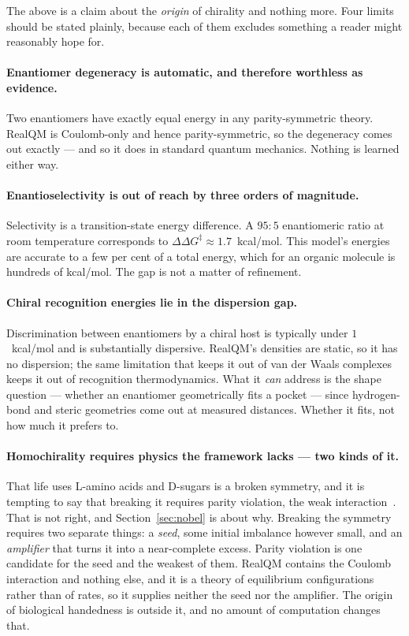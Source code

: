 \documentclass[11pt]{article}
\begin{document}
The above is a claim about the \emph{origin} of chirality and nothing more. Four limits should be
stated plainly, because each of them excludes something a reader might reasonably hope for.

\paragraph{Enantiomer degeneracy is automatic, and therefore worthless as evidence.} Two
enantiomers have exactly equal energy in any parity-symmetric theory. RealQM is Coulomb-only and
hence parity-symmetric, so the degeneracy comes out exactly --- and so it does in standard quantum
mechanics. Nothing is learned either way.

\paragraph{Enantioselectivity is out of reach by three orders of magnitude.} Selectivity is a
transition-state energy difference. A $95{:}5$ enantiomeric ratio at room temperature corresponds
to $\Delta\Delta G^{\ddagger} \approx 1.7$~kcal/mol. This model's energies are accurate to a few
per cent of a total energy, which for an organic molecule is hundreds of kcal/mol. The gap is not
a matter of refinement.

\paragraph{Chiral recognition energies lie in the dispersion gap.} Discrimination between
enantiomers by a chiral host is typically under $1$~kcal/mol and is substantially dispersive.
RealQM's densities are static, so it has no dispersion; the same limitation that keeps it out of
van der Waals complexes keeps it out of recognition thermodynamics. What it \emph{can} address is
the shape question --- whether an enantiomer geometrically fits a pocket --- since hydrogen-bond
and steric geometries come out at measured distances. Whether it fits, not how much it prefers to.

\paragraph{Homochirality requires physics the framework lacks --- two kinds of it.} That life uses
L-amino acids and D-sugars is a broken symmetry, and it is tempting to say that breaking it requires
parity violation, the weak interaction~\cite{Quack2002}. That is not right, and
Section~\ref{sec:nobel} is about why. Breaking the symmetry requires two separate things: a
\emph{seed}, some initial imbalance however small, and an \emph{amplifier} that turns it into a
near-complete excess. Parity violation is one candidate for the seed and the weakest of them.
RealQM contains the Coulomb interaction and nothing else, and it is a theory of equilibrium
configurations rather than of rates, so it supplies neither the seed nor the amplifier. The origin
of biological handedness is outside it, and no amount of computation changes that.
\end{document}

